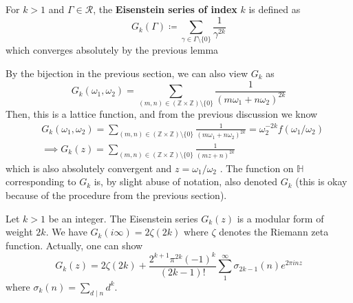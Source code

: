 \documentclass[12pt]{article}
\theoremstyle{definition}
\begin{document}
\begin{dfn}
For \(k>1\) and \(\Gamma \in \mathscr{R} \), the \textbf{Eisenstein series of index} \(k\) is defined as
\[
    G_k(\Gamma )\coloneqq \sum_{\gamma \in \Gamma\setminus \{ 0 \}  } \frac{1}{\gamma ^{2k}} 
\]    
which converges absolutely by the previous lemma
\end{dfn}
By the bijection in the previous section, we can also view \(G_k\) as
\[
    G_k(\omega _1,\omega _2) = \sum_{(m,n)\in (\mathbb{Z} \times \mathbb{Z}) \setminus \{ 0 \}  }\frac{1}{(m \omega _1+ n \omega _2)^{2k}}
\] 
Then, this is a lattice function, and from the previous discussion we know
\begin{align*}
    &G_k(\omega _1,\omega _2) = \sum_{(m,n)\in (\mathbb{Z} \times \mathbb{Z}) \setminus \{ 0 \}  }\frac{1}{(m \omega _1+ n \omega _2)^{2k}} = \omega _2^{-2k} f(\omega_1/\omega_2)\\  &\implies G_k(z) = \sum_{(m,n)\in (\mathbb{Z} \times \mathbb{Z}) \setminus \{ 0 \}  }\frac{1}{(m z+n)^{2k}}
\end{align*}
which is also absolutely convergent and \(z=\omega_1/\omega _2\) . The function on \(\mathbb{H}\) corresponding to \(G_k\) is, by slight abuse of notation, also denoted \(G_k\) (this is okay because of the procedure from the previous section). 
\begin{prop}[label=eisen]
Let \(k>1\) be an integer. The Eisenstein series \(G_k(z)\) is a modular form of weight \(2k\). We have \(G_k(i\infty ) = 2\zeta (2k)\) where \(\zeta \) denotes the Riemann zeta function. Actually, one can show
\[
    G_k(z) = 2 \zeta (2k) + \frac{2^{k+1}\pi ^{2k}(-1)^k}{(2k-1)!} \sum_1^{\infty} \sigma_{2k-1}(n)e^{2\pi inz}
\]
where \(\sigma_k(n) = \sum_{d \mid n} d^k\). 
\end{prop}
\end{document}
